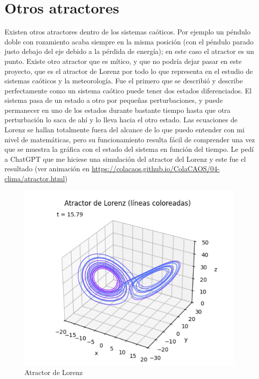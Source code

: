\documentclass[
  10pt,
  a4paper,
  DIV=11,
  numbers=noendperiod,
  open=any]{scrreprt}
\numberwithin{equation}{chapter}
\numberwithin{equation}{section}
\renewcommand{\[}{\begin{equation}}
\renewcommand{\]}{\end{equation}}
\begin{document}
\section{Otros atractores}\label{otros-atractores}

Existen otros atractores dentro de los sistemas caóticos. Por ejemplo un
péndulo doble con rozamiento acaba siempre en la misma posición (con el
péndulo parado justo debajo del eje debido a la pérdida de energía); en
este caso el atractor es un punto. Existe otro atractor que es mítico, y
que no podría dejar pasar en este proyecto, que es el atractor de Lorenz
por todo lo que representa en el estudio de sistemas caóticos y la meteorología. Fue el primero que se describió y describe perfectamente como un
sistema caótico puede tener dos estados diferenciados. El sistema pasa
de un estado a otro por pequeñas perturbaciones, y puede permanecer en
uno de los estados durante bastante tiempo hasta que otra perturbación
lo saca de ahí y lo lleva hacia el otro estado. Las ecuaciones de Lorenz
se hallan totalmente fuera del alcance de lo que puedo entender con mi
nivel de matemáticas, pero su funcionamiento resulta fácil de comprender
una vez que se muestra la gráfica con el estado del sistema en función
del tiempo. Le pedí a ChatGPT que me hiciese una simulación del atractor
del Lorenz y este fue el resultado (ver animación en \url{https://colacaos.github.io/ColaCAOS/04-clima/atractor.html})

\begin{figure}[h]
  \centering
  \includegraphics[width=0.99\textwidth]{04-clima/lorenz_lines_rainbow_time.png}
  \caption{Atractor de Lorenz}
\end{figure}
\end{document}
